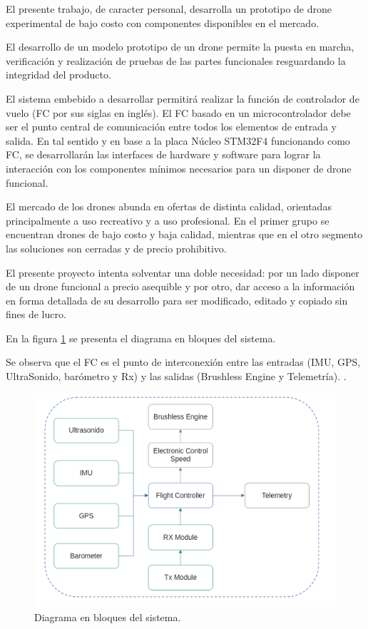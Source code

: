\documentclass[
11pt, %
]{charter}
\begin{document}
	El presente trabajo, de caracter personal, desarrolla un prototipo de drone experimental de bajo costo con componentes disponibles en el mercado.

	El desarrollo de un modelo prototipo de un drone permite la puesta en marcha, verificación y realización de pruebas de las partes funcionales resguardando la integridad del producto.

	El sistema embebido a desarrollar permitirá realizar la función de controlador de vuelo (FC por sus siglas en inglés). El FC basado en un microcontrolador debe ser el punto central de comunicación entre todos los elementos de entrada y salida. En tal sentido y en base a la placa Núcleo STM32F4 funcionando como FC, se desarrollarán las interfaces de hardware y software para lograr la interacción con los componentes mínimos necesarios para un disponer de drone funcional.

	El mercado de los drones abunda en ofertas de distinta calidad, orientadas principalmente a uso recreativo y a uso profesional. En el primer grupo se encuentran drones de bajo costo y baja calidad, mientras que en el otro segmento las soluciones son cerradas y de precio prohibitivo. 
	
	El presente proyecto intenta solventar una doble necesidad: por un lado disponer de un drone funcional a precio asequible y por otro, dar acceso a la información en forma detallada de su desarrollo para ser modificado, editado y copiado sin fines de lucro. 
	

	En la figura \ref{fig:diagBloques} se presenta el diagrama en bloques del sistema. 
	
	Se observa que el FC es el punto de interconexión entre las entradas (IMU, GPS, UltraSonido, barómetro y Rx) y las salidas (Brushless Engine y Telemetría).
.  

	\begin{figure}[htpb]
		\centering
		\includegraphics[width=.75\textwidth]{./Figuras/Diagrama_Bloques.png}
		\caption{Diagrama en bloques del sistema.}
		\label{fig:diagBloques}
	\end{figure}
\end{document}
